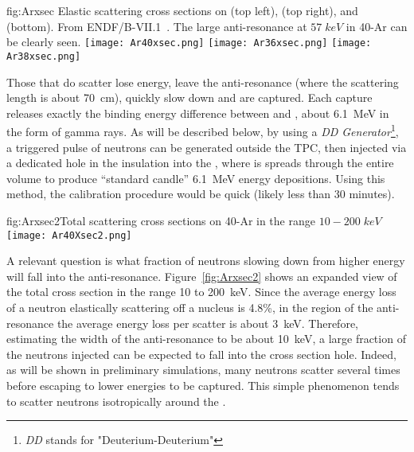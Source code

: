 \begin{dunefigure}{fig:Arxsec}
{Elastic scattering cross sections on  (top left),  (top right), and  (bottom). From ENDF/B-VII.1~\cite{ref:ENDF}. The large anti-resonance at $57\; keV$ in 40-Ar can be clearly seen.}
\texttt{[image: Ar40xsec.png]}
\texttt{[image: Ar36xsec.png]}
\texttt{[image: Ar38xsec.png]}
\end{dunefigure}

Those that do scatter lose energy, leave the anti-resonance (where the scattering length is about \SI{70}{\cm}), quickly slow down and are captured. Each capture releases exactly the binding energy difference between  and , about \SI{6.1}{\MeV} in the form of gamma rays.  As will be described below, by using a {\it DD Generator}\footnote{{\it DD} stands for "Deuterium-Deuterium" }, a triggered pulse of neutrons can be generated outside the TPC, then injected via a dedicated hole in the insulation into the , where is spreads through the entire volume to produce ``standard candle'' \SI{6.1}{\MeV} energy depositions. Using this method, 
the calibration procedure would be quick (likely less than 30 minutes).

\begin{dunefigure}[h]{fig:Arxsec2}{Total scattering cross sections on 40-Ar in the range $10-200\; keV$~\cite{ref:ENDF}}
\texttt{[image: Ar40Xsec2.png]}
\end{dunefigure}

A relevant question is what fraction of neutrons slowing down from higher energy will fall into the anti-resonance. Figure~\ref{fig:Arxsec2} shows an expanded view of the total  cross section in the range  \num{10} to \SI{200}{\keV}. Since the average energy loss of a neutron elastically scattering off a  nucleus is \num{4.8}\%, in the region of the anti-resonance the average energy loss per scatter is about \SI{3}{\keV}. Therefore, estimating the width of the anti-resonance to be about \SI{10}{\keV}, a large fraction of the neutrons injected can be expected to fall into the cross section hole. Indeed, as will be shown in preliminary simulations, many neutrons scatter several times before escaping to lower energies to be captured. This simple phenomenon tends to scatter neutrons isotropically around the .


